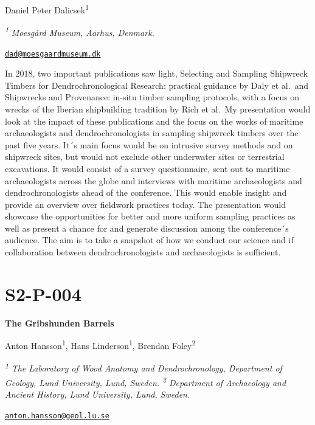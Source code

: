 \documentclass[
]{book}
\begin{document}
Daniel Peter Dalicsek\textsuperscript{1}

\textsuperscript{\emph{1}} \emph{Moesgård Museum, Aarhus, Denmark.}

\href{mailto:dad@moesgaardmuseum.dk}{\nolinkurl{dad@moesgaardmuseum.dk}}

In 2018, two important publications saw light, Selecting and Sampling Shipwreck Timbers for Dendrochronological Research: practical guidance by Daly et al.~and Shipwrecks and Provenance: in-situ timber sampling protocols, with a focus on wrecks of the Iberian shipbuilding tradition by Rich et al.~My presentation would look at the impact of these publications and the focus on the works of maritime archaeologists and dendrochronologists in sampling shipwreck timbers over the past five years. It´s main focus would be on intrusive survey methods and on shipwreck sites, but would not exclude other underwater sites or terrestrial excavations. It would consist of a survey questionnaire, sent out to maritime archaeologists across the globe and interviews with maritime archaeologists and dendrochronologists ahead of the conference. This would enable insight and provide an overview over fieldwork practices today. The presentation would showcase the opportunities for better and more uniform sampling practices as well as present a chance for and generate discussion among the conference´s audience. The aim is to take a snapshot of how we conduct our science and if collaboration between dendrochronologists and archaeologists is sufficient.

\hypertarget{s2-p-004}{%
\section*{S2-P-004}\label{s2-p-004}}

\textbf{The Gribshunden Barrels}

Anton Hansson\textsuperscript{1}, Hans Linderson\textsuperscript{1}, Brendan Foley\textsuperscript{2}

\textsuperscript{\emph{1}} \emph{The Laboratory of Wood Anatomy and Dendrochronology, Department of Geology, Lund University, Lund, Sweden. \textsuperscript{2} Department of Archaeology and Ancient History, Lund University, Lund, Sweden.}

\href{mailto:anton.hansson@geol.lu.se}{\nolinkurl{anton.hansson@geol.lu.se}}
\end{document}
